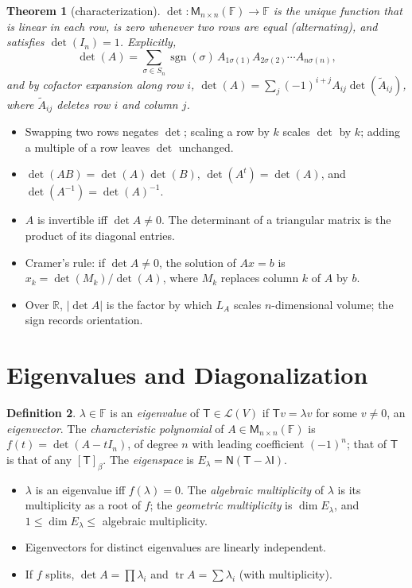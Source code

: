 \documentclass[12pt]{article}
\newtheorem{theorem}{Theorem}[section]
\theoremstyle{definition}
\newtheorem{definition}[theorem]{Definition}
\theoremstyle{remark}
\newcommand{\F}{\mathbb{F}}
\newcommand{\R}{\mathbb{R}}
\newcommand{\N}{\mathsf{N}}
\newcommand{\Lin}{\mathcal{L}}
\newcommand{\M}{\mathsf{M}}
\newcommand{\T}{\mathsf{T}}
\newcommand{\I}{\mathsf{I}}
\DeclareMathOperator{\tr}{tr}
\renewcommand{\det}{\operatorname{det}}
\begin{document}
\begin{theorem}[characterization]
$\det\colon\M_{n\times n}(\F)\to\F$ is the unique function that is linear in each row, is zero whenever two rows are
equal (alternating), and satisfies $\det(I_n)=1$. Explicitly,
\[
\det(A)=\sum_{\sigma\in S_n}\operatorname{sgn}(\sigma)\,A_{1\sigma(1)}A_{2\sigma(2)}\cdots A_{n\sigma(n)},
\]
and by cofactor expansion along row $i$, $\det(A)=\sum_{j}(-1)^{i+j}A_{ij}\det(\tilde A_{ij})$, where $\tilde A_{ij}$ deletes row $i$ and column $j$.
\end{theorem}

\begin{itemize}
  \item Swapping two rows negates $\det$; scaling a row by $k$ scales $\det$ by $k$; adding a multiple of a row leaves $\det$ unchanged.
  \item $\det(AB)=\det(A)\det(B)$, $\det(A^t)=\det(A)$, and $\det(A^{-1})=\det(A)^{-1}$.
  \item $A$ is invertible iff $\det A\neq0$. The determinant of a triangular matrix is the product of its diagonal entries.
  \item Cramer's rule: if $\det A\neq0$, the solution of $Ax=b$ is $x_k=\det(M_k)/\det(A)$, where $M_k$ replaces column $k$ of $A$ by $b$.
  \item Over $\R$, $\lvert\det A\rvert$ is the factor by which $L_A$ scales $n$-dimensional volume; the sign records orientation.
\end{itemize}

\section{Eigenvalues and Diagonalization}

\begin{definition}
$\lambda\in\F$ is an \emph{eigenvalue} of $\T\in\Lin(V)$ if $\T v=\lambda v$ for some $v\neq0$, an \emph{eigenvector}.
The \emph{characteristic polynomial} of $A\in\M_{n\times n}(\F)$ is $f(t)=\det(A-tI_n)$, of degree $n$ with leading
coefficient $(-1)^n$; that of $\T$ is that of any $[\T]_\beta$. The \emph{eigenspace} is $E_\lambda=\N(\T-\lambda\I)$.
\end{definition}

\begin{itemize}
  \item $\lambda$ is an eigenvalue iff $f(\lambda)=0$. The \emph{algebraic multiplicity} of $\lambda$ is its multiplicity as a root of $f$;
        the \emph{geometric multiplicity} is $\dim E_\lambda$, and $1\le\dim E_\lambda\le$ algebraic multiplicity.
  \item Eigenvectors for distinct eigenvalues are linearly independent.
  \item If $f$ splits, $\det A=\prod\lambda_i$ and $\tr A=\sum\lambda_i$ (with multiplicity).
\end{itemize}
\end{document}
